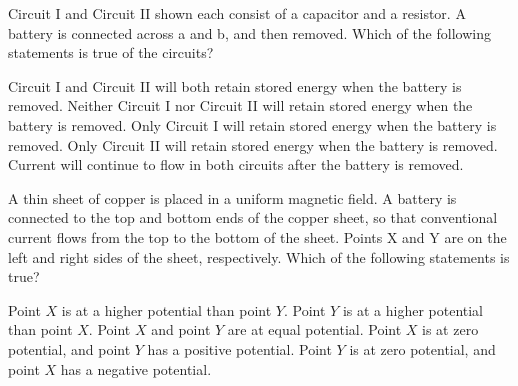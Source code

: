 \documentclass{../../oss-classkick-exam}
\begin{document}
\begin{questions}
  \question Circuit I and Circuit II shown each consist of a capacitor and a
  resistor. A battery is connected across a and b, and then removed. Which of
  the following statements is true of the circuits?
  \begin{center}
    \hspace{.5in}
  \end{center}
  \begin{choices}
    \choice Circuit I and Circuit II will both retain stored energy when the
    battery is removed.
    \choice Neither Circuit I nor Circuit II will retain stored energy when
    the battery is removed.
    \choice Only Circuit I will retain stored energy when the battery is
    removed.
    \choice Only Circuit II will retain stored energy when the battery is
    removed.
    \choice Current will continue to flow in both circuits after the battery
    is removed.
  \end{choices}
    
  \question A thin sheet of copper is placed in a uniform magnetic field. A
  battery is connected to the top and bottom ends of the copper sheet, so that
  conventional current flows from the top to the bottom of the sheet.
  Points X and Y are on the left and right sides of the sheet, respectively.
  Which of the following statements is true?
  \begin{center}
  \end{center}
  \begin{choices}
    \choice Point $X$ is at a higher potential than point $Y$.
    \choice Point $Y$ is at a higher potential than point $X$.
    \choice Point $X$ and point $Y$ are at equal potential.
    \choice Point $X$ is at zero potential, and point $Y$ has a positive
    potential.
    \choice Point $Y$ is at zero potential, and point $X$ has a negative
    potential.
  \end{choices}


\end{questions}
\end{document}
